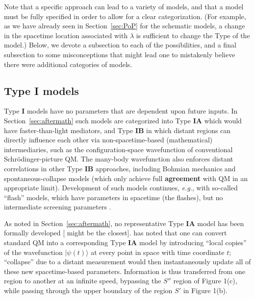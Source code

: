 \documentclass[rmp, aps, preprint, longbibliography]{revtex4-1}
\begin{document}
Note that a specific approach can lead to a variety of models, and that a model must be fully specified in order to allow for a clear categorization.  (For example, as we have already seen in Section~\ref{sec:PoP} for the schematic models, a change in the spacetime location associated with $\lambda$ is sufficient to change the Type of the model.)  Below, we devote a subsection to each of the possibilities, and a final subsection to some misconceptions that might lead one to mistakenly believe there were additional categories of models.


\subsection{Type {\bf I} models}

Type {\bf I} models have no parameters that are dependent upon future inputs.  In Section~\ref{sec:aftermath} such models are categorized into Type {\bf IA} which would have faster-than-light mediators, and Type {\bf IB} in which distant regions can directly influence each other via non-spacetime-based (mathematical) intermediaries, such as the configuration-space wavefunction of conventional Schr\"odinger-picture QM\@.  The many-body wavefunction also enforces distant correlations in other Type {\bf IB} approaches, including Bohmian mechanics \cite{bohm1952} and spontaneous-collapse models \cite{GRW} (which only achieve full {\bf agreement} with QM in an appropriate limit).  Development of such models continues, \emph{e.g.}, with so-called ``flash''  models, which have parameters in spacetime (the flashes), but no intermediate screening parameters \cite{tumulka2006}.  

As noted in Section~\ref{sec:aftermath}, no representative Type {\bf IA} model has been formally developed [\textcite{norsen2010} might be the closest].  \textcite{spekkens2015} has noted that one can convert standard QM into a corresponding Type {\bf IA} model by introducing ``local copies'' of the wavefunction $|\psi(t)\rangle$ at every point in space with time coordinate $t$; ``collapse'' due to a distant measurement would then instantaneously update all of these new spacetime-based parameters.  Information is thus transferred from one region to another at an infinite speed, bypassing the $S''$ region of Figure 1(c), while passing through the upper boundary of the region $S'$ in Figure 1(b).
\end{document}
